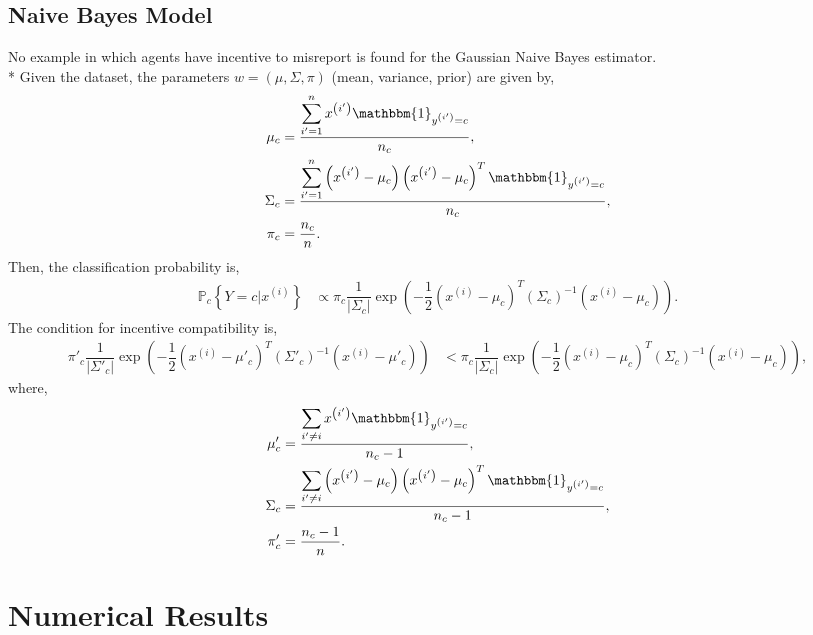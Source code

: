 \documentclass{article}
\begin{document}
\subsection{Naive Bayes Model}
No example in which agents have incentive to misreport is found for the Gaussian Naive Bayes estimator.
\\* Given the dataset, the parameters $w  = \left(\mu, \Sigma, \pi\right)$ (mean, variance, prior) are given by,
\begin{align*}
\mu_{c} &= \dfrac{\displaystyle\sum_{i'=1}^{n} x^{\left(i'\right)} \mathbbm{1}_{y^{\left(i'\right)} = c}}{n_{c}},
\\ \Sigma_{c} &= \dfrac{\displaystyle\sum_{i'=1}^{n} \left(x^{\left(i'\right)} - \mu_{c}\right) \left(x^{\left(i'\right)} - \mu_{c}\right)^{T} \mathbbm{1}_{y^{\left(i'\right)} = c}}{n_{c}},
\\ \pi_{c} &= \dfrac{n_{c}}{n} .
\end{align*}
Then, the classification probability is,
\begin{align*}
\mathbb{P}_{c} \left\{Y = c | x^{\left(i\right)}\right\} &\propto \pi_{c} \dfrac{1}{\left| \Sigma_{c} \right|} \exp\left(- \dfrac{1}{2} \left(x^{\left(i\right)} - \mu_{c}\right)^{T} \left(\Sigma_{c}\right)^{-1} \left(x^{\left(i\right)} - \mu_{c}\right)\right).
\end{align*}
The condition for incentive compatibility is,
\begin{align*}
\pi'_{c} \dfrac{1}{\left| \Sigma'_{c} \right|} \exp\left(- \dfrac{1}{2} \left(x^{\left(i\right)} - \mu'_{c}\right)^{T} \left(\Sigma'_{c}\right)^{-1} \left(x^{\left(i\right)} - \mu'_{c}\right)\right) &< \pi_{c} \dfrac{1}{\left| \Sigma_{c} \right|} \exp\left(- \dfrac{1}{2} \left(x^{\left(i\right)} - \mu_{c}\right)^{T} \left(\Sigma_{c}\right)^{-1} \left(x^{\left(i\right)} - \mu_{c}\right)\right),
\end{align*}
where,
\begin{align*}
\mu'_{c} &= \dfrac{\displaystyle\sum_{i' \neq  i} x^{\left(i'\right)} \mathbbm{1}_{y^{\left(i'\right)} = c}}{n_{c} - 1},
\\ \Sigma_{c} &= \dfrac{\displaystyle\sum_{i' \neq  i} \left(x^{\left(i'\right)} - \mu_{c}\right) \left(x^{\left(i'\right)} - \mu_{c}\right)^{T} \mathbbm{1}_{y^{\left(i'\right)} = c}}{n_{c} - 1},
\\ \pi'_{c} &= \dfrac{n_{c} - 1}{n} .
\end{align*}




\section{Numerical Results} 
\end{document}
